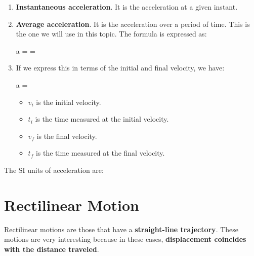 \begin{enumerate}[label=\numberballmDarkTeal]
        \item \textbf{Instantaneous acceleration}.
        It is the acceleration at a given instant.

        \item \textbf{Average acceleration}.
        It is the acceleration over a period of time.
        This is the one we will use in this topic.
        The formula is expressed as:
        \begin{centeredequation}
            a =  = 
        \end{centeredequation}

        \item If we express this in terms of the initial and final velocity, we have:
        \begin{centeredequation}
            a = 
        \end{centeredequation}
        \begin{itemize}
            \item \( v_i \) is the initial velocity.
            \item \( t_i \) is the time measured at the initial velocity.
            \item \( v_f \) is the final velocity.
            \item \( t_f \) is the time measured at the final velocity.
        \end{itemize}
\end{enumerate}

The SI units of acceleration are: \unit{\mpss}


\section{Rectilinear Motion}

Rectilinear motions are those that have a \textbf{straight-line trajectory}.
These motions are very interesting because in these cases, \textbf{displacement coincides with the distance traveled}.

